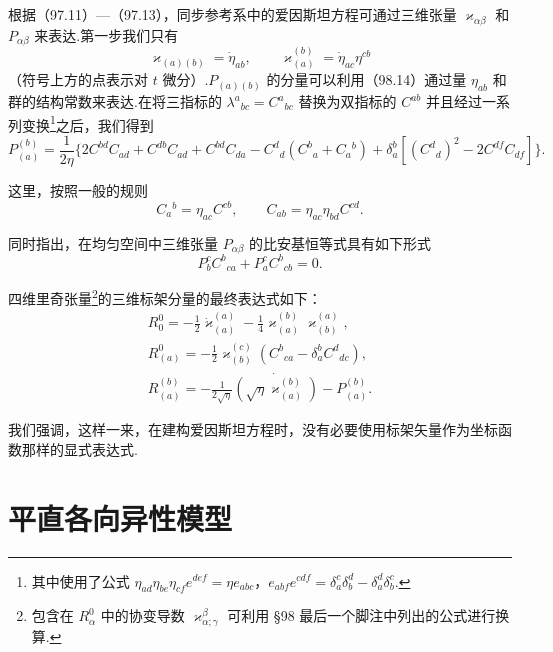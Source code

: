 根据（97.11）—（97.13），同步参考系中的爱因斯坦方程可通过三维张量 $\varkappa_{\alpha\beta}$ 和 $P_{\alpha\beta}$ 来表达.第一步我们只有
\begin{equation}
  \varkappa_{(a)(b)}=\dot{\eta}_{ab},\qquad
  \varkappa_{(a)}^{(b)}=\dot{\eta}_{ac}\eta^{cb}
\end{equation}
（符号上方的点表示对 $t$ 微分）.$P_{(a)(b)}$ 的分量可以利用（98.14）通过量 $\eta_{ab}$ 和群的结构常数来表达.在将三指标的 $\lambda^{a}{}_{bc}=C^{a}{}_{bc}$ 替换为双指标的 $C^{ab}$ 并且经过一系列变换\footnote{其中使用了公式 $\eta_{ad}\eta_{be}\eta_{cf}e^{def}=\eta e_{abc}$，$e_{abf}e^{cdf}=\delta_{a}^{c}\delta_{b}^{d}-\delta_{a}^{d}\delta_{b}^{c}$.}之后，我们得到
\begin{equation}
  P_{(a)}^{(b)}=\frac{1}{2\eta}\bigl\{
  2C^{bd}C_{ad}+C^{db}C_{ad}+C^{bd}C_{da}
  -C^{d}{}_{d}(C^{b}{}_{a}+C_{a}{}^{b})
  +\delta_{a}^{b}[(C^{d}{}_{d})^{2}-2C^{df}C_{df}]\bigr\}.
\end{equation}

这里，按照一般的规则
\begin{equation*}
  C_{a}{}^{b}=\eta_{ac}C^{cb},\qquad
  C_{ab}=\eta_{ac}\eta_{bd}C^{cd}.
\end{equation*}

同时指出，在均匀空间中三维张量 $P_{\alpha\beta}$ 的比安基恒等式具有如下形式
\begin{equation}
  P_{b}^{c}C^{b}{}_{ca}+P_{a}^{c}C^{b}{}_{cb}=0.
\end{equation}

四维里奇张量\footnote{包含在 $R_{\alpha}^{0}$ 中的协变导数 $\varkappa_{\alpha;\gamma}^{\beta}$ 可利用 §98 最后一个脚注中列出的公式进行换算.}的三维标架分量的最终表达式如下：
\begin{equation}
  \begin{gathered}
    R_{0}^{0}=-\frac{1}{2}\dot{\varkappa}_{(a)}^{(a)}
    -\frac{1}{4}\varkappa_{(a)}^{(b)}\varkappa_{(b)}^{(a)},\\
    R_{(a)}^{0}
    =-\frac{1}{2}\varkappa_{(b)}^{(c)}
    (C^{b}{}_{ca}-\delta_{a}^{b}C^{d}{}_{dc}),\\
    R_{(a)}^{(b)}
    =-\frac{1}{2\sqrt{\eta}}
    \dot{(\sqrt{\eta}\varkappa_{(a)}^{(b)})}
    -P_{(a)}^{(b)}.
  \end{gathered}
\end{equation}

我们强调，这样一来，在建构爱因斯坦方程时，没有必要使用标架矢量作为坐标函数那样的显式表达式.

\section{平直各向异性模型}

